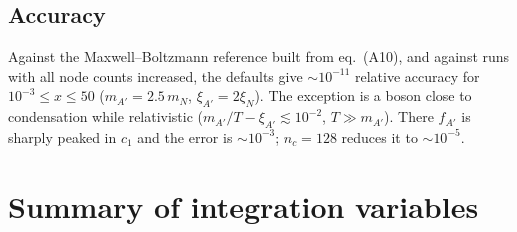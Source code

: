 \documentclass[11pt,a4paper]{article}
\begin{document}
\subsection{Accuracy}

Against the Maxwell--Boltzmann reference built from eq.~(A10), and against
runs with all node counts increased, the defaults give $\sim10^{-11}$
relative accuracy for $10^{-3}\le x\le50$ ($m_{A'}=2.5\,m_N$,
$\xi_{A'}=2\xi_N$). The exception is a boson close to condensation while
relativistic ($m_{A'}/T-\xi_{A'}\lesssim10^{-2}$, $T\gg m_{A'}$). There
$f_{A'}$ is sharply peaked in $c_1$ and the error is $\sim10^{-3}$;
$n_c=128$ reduces it to $\sim10^{-5}$.

\section{Summary of integration variables}

\begin{center}
\small
\renewcommand{\arraystretch}{1.3}
\end{center}
\end{document}

